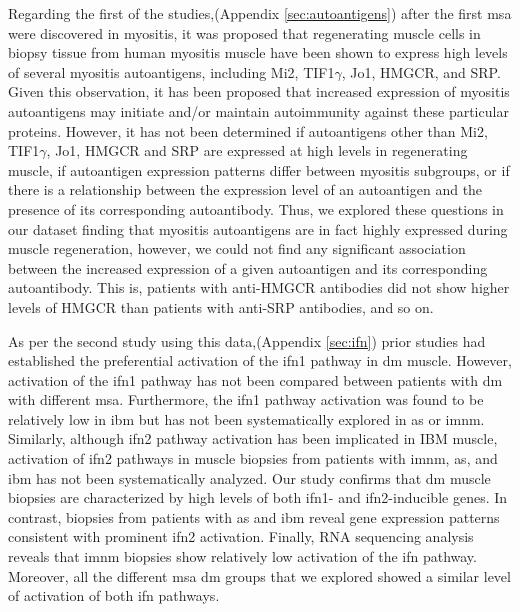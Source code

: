 Regarding the first of the studies,(Appendix \autoref{sec:autoantigens}) after the first \gls{msa} were discovered in myositis, it was proposed that regenerating muscle cells in biopsy tissue from human myositis muscle have been shown to express high levels of several myositis autoantigens, including Mi2, TIF1$\gamma$, Jo1, HMGCR, and SRP.\cite{Mohassel2015,Mammen2009,CasciolaRosen2005,Allenbach2018} Given this observation, it has been proposed that increased expression of myositis autoantigens may initiate and/or maintain autoimmunity against these particular proteins. However, it has not been determined if autoantigens other than Mi2, TIF1$\gamma$, Jo1, HMGCR and SRP are expressed at high levels in regenerating muscle, if autoantigen expression patterns differ between myositis subgroups, or if there is a relationship between the expression level of an autoantigen and the presence of its corresponding autoantibody. Thus, we explored these questions in our dataset finding that myositis autoantigens are in fact highly expressed during muscle regeneration, however, we could not find any significant association between the increased expression of a given autoantigen and its corresponding autoantibody. This is, patients with anti-HMGCR antibodies did not show higher levels of HMGCR than patients with anti-SRP antibodies, and so on.

As per the second study using this data,(Appendix \autoref{sec:ifn}) prior studies had established the preferential activation of the \gls{ifn}1 pathway in \gls{dm} muscle.\cite{Greenberg2005} However, activation of the \gls{ifn}1 pathway has not been compared between patients with \gls{dm} with different \gls{msa}. Furthermore, the \gls{ifn}1 pathway activation was found to be relatively low in \gls{ibm} but has not been systematically explored in \gls{as} or \gls{imnm}.\cite{Greenberg2005,Salajegheh2010,Greenberg2002} Similarly, although \gls{ifn}2 pathway activation has been implicated in IBM muscle,\cite{Ivanidze2011,Allenbach2014} activation of \gls{ifn}2 pathways in muscle biopsies from patients with \gls{imnm}, \gls{as}, and \gls{ibm} has not been systematically analyzed. Our study confirms that \gls{dm} muscle biopsies are characterized by high levels of both \gls{ifn}1- and \gls{ifn}2-inducible genes. In contrast, biopsies from patients with \gls{as} and \gls{ibm} reveal gene expression patterns consistent with prominent \gls{ifn}2 activation. Finally, RNA sequencing analysis reveals that \gls{imnm} biopsies show relatively low activation of the \gls{ifn} pathway. Moreover, all the different \gls{msa} \gls{dm} groups that we explored showed a similar level of activation of both \gls{ifn} pathways.

